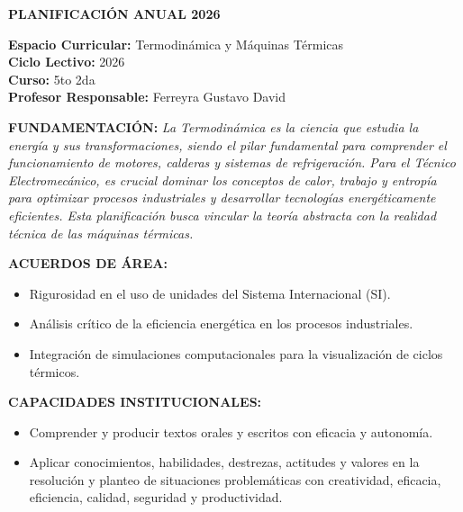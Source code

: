 \documentclass[11pt, a4paper]{article}
\begin{document}
\noindent\colorbox{schoolgreen}{\begin{minipage}{\dimexpr\textwidth-2\fboxsep}\centering \textbf{\fontsize{14}{16}\selectfont PLANIFICACIÓN ANUAL 2026}\end{minipage}}

\vspace{1em}
\begin{flushleft}
\textbf{Espacio Curricular:} Termodinámica y Máquinas Térmicas \\
\textbf{Ciclo Lectivo:} 2026 \\
\textbf{Curso:} 5to 2da \\
\textbf{Profesor Responsable:} Ferreyra Gustavo David
\end{flushleft}

\vspace{1em}
\noindent \textbf{FUNDAMENTACIÓN:}
\textit{La Termodinámica es la ciencia que estudia la energía y sus transformaciones, siendo el pilar fundamental para comprender el funcionamiento de motores, calderas y sistemas de refrigeración. Para el Técnico Electromecánico, es crucial dominar los conceptos de calor, trabajo y entropía para optimizar procesos industriales y desarrollar tecnologías energéticamente eficientes. Esta planificación busca vincular la teoría abstracta con la realidad técnica de las máquinas térmicas.}

\vspace{1em}
\noindent \textbf{ACUERDOS DE ÁREA:}
\begin{itemize}
\item Rigurosidad en el uso de unidades del Sistema Internacional (SI).
\item Análisis crítico de la eficiencia energética en los procesos industriales.
\item Integración de simulaciones computacionales para la visualización de ciclos térmicos.
\end{itemize}

\vspace{1em}
\noindent \textbf{CAPACIDADES INSTITUCIONALES:}
\begin{itemize}
\item Comprender y producir textos orales y escritos con eficacia y autonomía.
\item Aplicar conocimientos, habilidades, destrezas, actitudes y valores en la resolución y planteo de situaciones problemáticas con creatividad, eficacia, eficiencia, calidad, seguridad y productividad.
\end{itemize}
\end{document}
